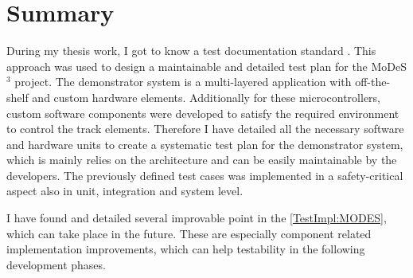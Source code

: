 \chapter{Summary}\label{chapter:Summary}
During my thesis work, I got to know a test documentation standard \cite{IEEE13}. This approach was used to design a maintainable and detailed test plan for the MoDeS$^3$ project. The demonstrator system is a multi-layered application with off-the-shelf and custom hardware elements. Additionally for these microcontrollers, custom software components were developed to satisfy the required environment to control the track elements. Therefore I have detailed all the necessary software and hardware units to create a systematic test plan for the demonstrator system, which is mainly relies on the architecture and can be easily maintainable by the developers. The previously defined test cases was implemented in a safety-critical aspect also in unit, integration and system level.

I have found and detailed several improvable point in the \autoref{TestImpl:MODES}, which can take place in the future. These are especially component related implementation improvements, which can help testability in the following development phases.
